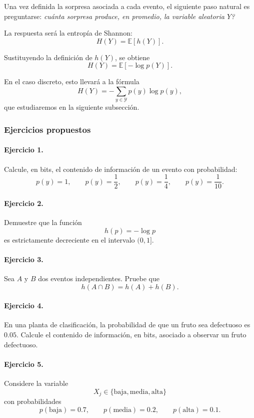 \documentclass{article}
\begin{document}
Una vez definida la sorpresa asociada a cada evento, el siguiente paso natural es preguntarse: \emph{cuánta sorpresa produce, en promedio, la variable aleatoria \(Y\)?}

La respuesta será la entropía de Shannon:
\[
H(Y)=\mathbb{E}[h(Y)].
\]

Sustituyendo la definición de \(h(Y)\), se obtiene
\[
H(Y)=\mathbb{E}[-\log p(Y)].
\]

En el caso discreto, esto llevará a la fórmula
\[
H(Y)=-\sum_{y\in\mathcal{Y}} p(y)\log p(y),
\]
que estudiaremos en la siguiente subsección.

\subsubsection*{Ejercicios propuestos}

\paragraph{Ejercicio 1.}
Calcule, en bits, el contenido de información de un evento con probabilidad:
\[
p(y)=1,\qquad p(y)=\frac{1}{2},\qquad p(y)=\frac{1}{4},\qquad p(y)=\frac{1}{10}.
\]

\paragraph{Ejercicio 2.}
Demuestre que la función
\[
h(p)=-\log p
\]
es estrictamente decreciente en el intervalo \((0,1]\).

\paragraph{Ejercicio 3.}
Sea \(A\) y \(B\) dos eventos independientes. Pruebe que
\[
h(A\cap B)=h(A)+h(B).
\]

\paragraph{Ejercicio 4.}
En una planta de clasificación, la probabilidad de que un fruto sea defectuoso es \(0.05\). Calcule el contenido de información, en bits, asociado a observar un fruto defectuoso.

\paragraph{Ejercicio 5.}
Considere la variable
\[
X_j\in\{\text{baja},\text{media},\text{alta}\}
\]
con probabilidades
\[
p(\text{baja})=0.7,\qquad p(\text{media})=0.2,\qquad p(\text{alta})=0.1.
\]
\end{document}

